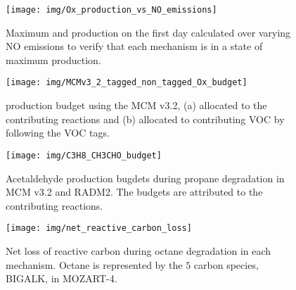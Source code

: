 %
\begin{figure}[!h]
    \begin{center}
        \texttt{[image: img/Ox\_production\_vs\_NO\_emissions]}
        \caption{Maximum  and  production on the first day calculated over varying NO emissions to verify that each mechanism is in a state of maximum  production.}
    \end{center}
\end{figure} 
%
\begin{figure}[!h]
    \begin{center}
        \vspace{-15mm}
        \texttt{[image: img/MCMv3\_2\_tagged\_non\_tagged\_Ox\_budget]}
        \caption{ production budget using the MCM v3.2, (a) allocated to the contributing reactions and (b) allocated to contributing VOC by following the VOC tags.}
    \end{center}
\end{figure} 
%
\begin{figure}[!h]
    \begin{center}
        \vspace{-1.3cm}
        \texttt{[image: img/C3H8\_CH3CHO\_budget]}
        \caption{Acetaldehyde production bugdets during propane degradation in MCM v3.2 and RADM2. The budgets are attributed to the contributing reactions.}
    \end{center}
\end{figure} 
%
\begin{figure}[!h]
    \begin{center}
        \texttt{[image: img/net\_reactive\_carbon\_loss]}
        \caption{Net loss of reactive carbon during octane degradation in each mechanism. Octane is represented by the $5$ carbon species, BIGALK, in MOZART-4.}
    \end{center}
\end{figure} 
